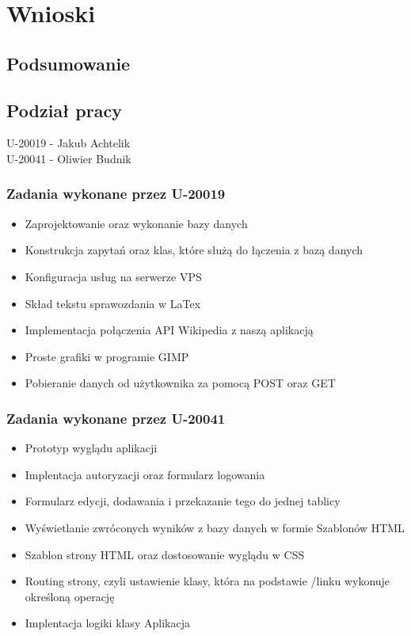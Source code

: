 \section{Wnioski}
    \subsection{Podsumowanie}
    \subsection{Podział pracy}

    U-20019 - Jakub Achtelik\\
    U-20041 - Oliwier Budnik\\

    \subsubsection{Zadania wykonane przez U-20019}
    \begin{itemize}
        \item Zaprojektowanie oraz wykonanie bazy danych
        \item Konstrukcja zapytań oraz klas, które służą do łączenia z bazą danych
        \item Konfiguracja usług na serwerze VPS
        \item Skład tekstu sprawozdania w LaTex
        \item Implementacja połączenia API Wikipedia z naszą aplikacją
        \item Proste grafiki w programie GIMP
        \item Pobieranie danych od użytkownika za pomocą POST oraz GET
    \end{itemize}
    \subsubsection{Zadania wykonane przez U-20041}
    \begin{itemize}

        \item Prototyp wyglądu aplikacji
        \item Implentacja autoryzacji oraz formularz logowania
        \item Formularz edycji, dodawania i przekazanie tego do jednej tablicy
        \item Wyświetlanie zwróconych wyników z bazy danych w formie Szablonów HTML
        \item Szablon strony HTML oraz dostosowanie wyglądu w CSS
        \item Routing strony, czyli ustawienie klasy, która na podstawie /linku wykonuje określoną operację
        \item Implentacja logiki klasy Aplikacja
    \end{itemize}
